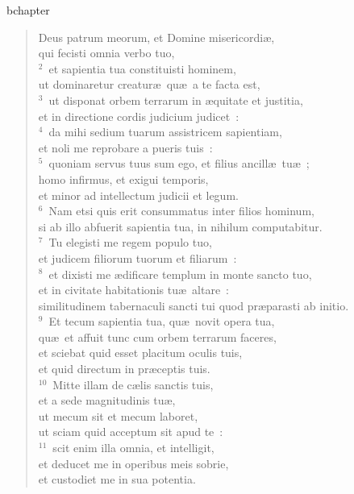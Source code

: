bchapter\begin{flushleft}\begin{verse}\vspace{-19pt}Deus patrum meorum, et Domine misericordi\ae ,\\ qui fecisti omnia verbo tuo,\\
${}^{2}$~et sapientia tua constituisti hominem,\\ ut dominaretur creatur\ae\ qu\ae\ a te facta est,\\
${}^{3}$~ut disponat orbem terrarum in \ae quitate et justitia,\\ et in directione cordis judicium judicet~:\\
${}^{4}$~da mihi sedium tuarum assistricem sapientiam,\\ et noli me reprobare a pueris tuis~:\\
${}^{5}$~quoniam servus tuus sum ego, et filius ancill\ae\ tu\ae~;\\ homo infirmus, et exigui temporis,\\ et minor ad intellectum judicii et legum.\\
${}^{6}$~Nam etsi quis erit consummatus inter filios hominum,\\ si ab illo abfuerit sapientia tua, in nihilum computabitur.\\
${}^{7}$~Tu elegisti me regem populo tuo,\\ et judicem filiorum tuorum et filiarum~:\\
${}^{8}$~et dixisti me \ae dificare templum in monte sancto tuo,\\ et in civitate habitationis tu\ae\ altare~:\\ similitudinem tabernaculi sancti tui quod pr\ae parasti ab initio.\\
${}^{9}$~Et tecum sapientia tua, qu\ae\ novit opera tua,\\ qu\ae\ et affuit tunc cum orbem terrarum faceres,\\ et sciebat quid esset placitum oculis tuis,\\ et quid directum in pr\ae ceptis tuis.\\
${}^{10}$~Mitte illam de c\ae lis sanctis tuis,\\ et a sede magnitudinis tu\ae ,\\ ut mecum sit et mecum laboret,\\ ut sciam quid acceptum sit apud te~:\\
${}^{11}$~scit enim illa omnia, et intelligit,\\ et deducet me in operibus meis sobrie,\\ et custodiet me in sua potentia.\\

\end{verse}
\end{flushleft}
